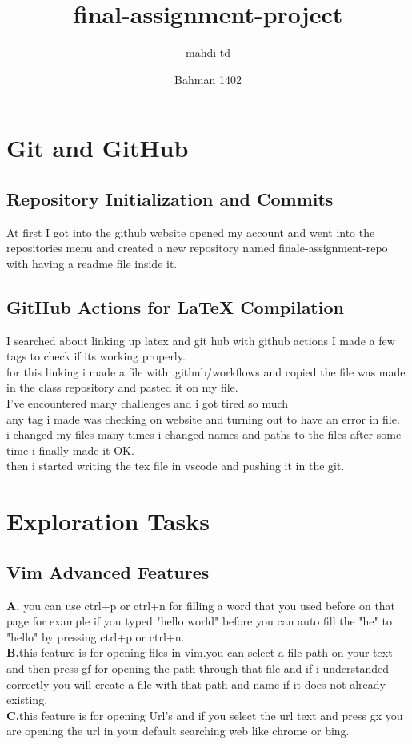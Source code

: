 \documentclass{article}
\title{final-assignment-project}
\author{mahdi td}
\date{Bahman 1402}
\begin{document}
\cfoot{\thepage}
\lhead{\thepage}
\maketitle
\newpage

\tableofcontents
{}
\newpage
{}
\section{Git and GitHub}
\subsection{Repository Initialization and Commits}
At first I got into the github website opened my account and went into the repositories menu and created a new repository named finale-assignment-repo with having a readme file inside it.
\subsection{GitHub Actions for LaTeX Compilation}
I searched about linking up latex and git hub with github actions I made a few tags to check if its working properly.\\
for this linking i made a file with .github/workflows and copied the file was made in the class repository and pasted it on my file.\\
I've encountered many challenges and i got tired so much\\
any tag i made was checking on website and turning out to have an error in file.\\
i changed my files many times i changed names and paths to the files after some time i finally made it OK.\\
then i started writing the tex file in vscode and pushing it in the git.
\section{ Exploration Tasks}
\subsection{Vim Advanced Features}
\textbf{A.}  you can use ctrl+p or ctrl+n for filling a word that you used before on that page for example if you typed "hello world" before you can auto fill the "he" to "hello" by pressing ctrl+p or ctrl+n.\\
\textbf{B.}this feature is for opening files in vim.you can select a file path on your text and then press gf for opening the path through that file and if i understanded correctly you will create a file with that path and name if it does not already existing.\\
\textbf{C.}this feature is for opening Url's and if you select the url text and press gx you are opening the url in your default searching web like chrome or bing.\\
\end{document}
